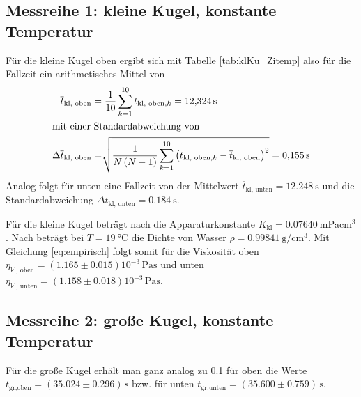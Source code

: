 \subsection{Messreihe 1: kleine Kugel, konstante Temperatur}
\label{sec:auswertung_mr1}

Für die kleine Kugel oben ergibt sich mit Tabelle \ref{tab:klKu_Zitemp} 
also für die Fallzeit ein arithmetisches Mittel von%
%
\begin{align*}
    \overline{t}_{\text{kl, oben}} &= \frac{1}{10} \sum_{k=1}^{10} {t_{\text{kl, oben}, k}} = \qty[]{12.324}{\s}\\%
%
\intertext{mit einer Standardabweichung von}%
%
    \Delta \overline{t}_{\text{kl, oben}} &= 
    \sqrt[]{\frac{1}{N \left(N-1\right)} \sum_{k=1}^{10} \left(t_{\text{kl, oben}, k} - \overline{t}_{\text{kl, oben}}\right)^2}
    = \qty[]{0.155}{\s}\\%
\end{align*}
Analog folgt für unten eine Fallzeit von der Mittelwert $\overline{t}_{\text{kl, unten}} = \qty[]{12.248}{\s}$
und die Standardabweichung $\Delta\overline{t}_{\text{kl, unten}} = \qty[]{0.184}{\s}$.



Für die kleine Kugel beträgt nach \cite*[]{va207} die Apparaturkonstante $K_{\text{kl}} = \qty[]{0.07640}{\milli\Pa \cubic\cm}$.
Nach \cite[]{geschke} beträgt bei $T = \qty{19}{\degreeCelsius}$ die Dichte von Wasser $\rho = \qty{0.99841}{\g \per \cm^3}$.
Mit Gleichung \eqref{eq:empirisch} folgt somit für die Viskosität oben $\eta_{\text{kl, oben}} = \left(1.165 \pm 0.015\right) 10^{-3} \, \unit{\pascal \s}$
und unten $\eta_{\text{kl, unten}} = \left(1.158 \pm 0.018\right) 10^{-3} \, \unit{\pascal \s}$.


\subsection{Messreihe 2: große Kugel, konstante Temperatur}

Für die große Kugel erhält man ganz analog zu \ref{sec:auswertung_mr1} für oben die Werte $t_{\text{gr,oben}} = \left(35.024 \pm 0.296\right) \, \unit{\s}$ 
bzw. für unten $t_{\text{gr,unten}} = \left(35.600 \pm 0.759\right) \, \unit{\s}$.

